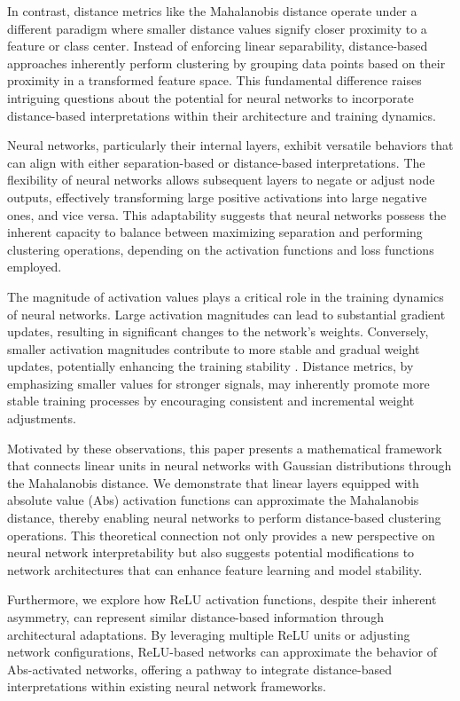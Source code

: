 In contrast, distance metrics like the Mahalanobis distance operate under a different paradigm where smaller distance values signify closer proximity to a feature or class center. Instead of enforcing linear separability, distance-based approaches inherently perform clustering by grouping data points based on their proximity in a transformed feature space. This fundamental difference raises intriguing questions about the potential for neural networks to incorporate distance-based interpretations within their architecture and training dynamics.

Neural networks, particularly their internal layers, exhibit versatile behaviors that can align with either separation-based or distance-based interpretations. The flexibility of neural networks allows subsequent layers to negate or adjust node outputs, effectively transforming large positive activations into large negative ones, and vice versa. This adaptability suggests that neural networks possess the inherent capacity to balance between maximizing separation and performing clustering operations, depending on the activation functions and loss functions employed.

The magnitude of activation values plays a critical role in the training dynamics of neural networks. Large activation magnitudes can lead to substantial gradient updates, resulting in significant changes to the network's weights. Conversely, smaller activation magnitudes contribute to more stable and gradual weight updates, potentially enhancing the training stability \citep{lecun2012efficient}. Distance metrics, by emphasizing smaller values for stronger signals, may inherently promote more stable training processes by encouraging consistent and incremental weight adjustments.

Motivated by these observations, this paper presents a mathematical framework that connects linear units in neural networks with Gaussian distributions through the Mahalanobis distance. We demonstrate that linear layers equipped with absolute value (Abs) activation functions can approximate the Mahalanobis distance, thereby enabling neural networks to perform distance-based clustering operations. This theoretical connection not only provides a new perspective on neural network interpretability but also suggests potential modifications to network architectures that can enhance feature learning and model stability.

Furthermore, we explore how ReLU activation functions, despite their inherent asymmetry, can represent similar distance-based information through architectural adaptations. By leveraging multiple ReLU units or adjusting network configurations, ReLU-based networks can approximate the behavior of Abs-activated networks, offering a pathway to integrate distance-based interpretations within existing neural network frameworks.


